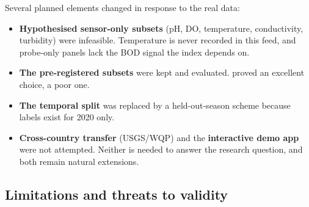 Several planned elements changed in response to the real data:
\begin{itemize}
  \item \textbf{Hypothesised sensor-only subsets} (pH, DO, temperature, conductivity, turbidity) were infeasible. Temperature is never recorded in this feed, and probe-only panels lack the BOD signal the index depends on.
  \item \textbf{The pre-registered subsets} were kept and evaluated.  proved an excellent choice,  a poor one.
  \item \textbf{The temporal split} was replaced by a held-out-season scheme because labels exist for 2020 only.
  \item \textbf{Cross-country transfer} (USGS/WQP) and the \textbf{interactive demo app} were not attempted. Neither is needed to answer the research question, and both remain natural extensions.
\end{itemize}

\fi\subsection{Limitations and threats to validity}

